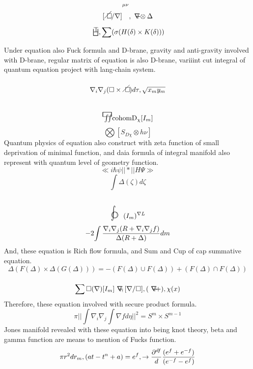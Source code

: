 \documentclass{jsarticle}
\begin{document}
  $$ {[\alearletter / \nabla]}^{\mu\nu}, \secproduct \otimes \Delta $$
  $$ \dazanier, \sum(\sigma(H(\delta)\times K(\delta))) $$

  Under equation also Fuck formula and D-brane, gravity and anti-gravity
  involved with D-brane, regular matrix of equation is also D-brane,
  variiint cut integral of quantum equation project with lang-chain system.
  $$ \nabla_{i}\nabla_{j}(\square \times \alearletter)d\tau, \sqrt{x_m y_m} $$
  $$ \squareiint \mathrm{cohom D_{\chi}}[I_m] $$
  $$ \bigotimes [S_{D\chi} \otimes h\nu] $$
  Quantum physics of equation also construct with zeta function of small 
  deprivation of minimal function, and daia formula of integral manifold
  also represent with quantum level of geometry function.
  $$ \ll i\hbar \psi||\ast||H\Psi \gg $$
  $$ \int \Delta(\zeta)d\zeta $$
　$$\whitewithbodercircleint (I_m)^{\nabla L} $$
 $$ -2{\int {{\nabla_{i}\nabla_{j}(R + \nabla_{i}\nabla_{j} f)} \over
 {\Delta(R + \Delta)}}}dm $$
 And, these equation is Rich flow formula, and Sum and Cup of cap 
 summative equation.
 $$ \Delta (F(\Delta) \times \Delta(G(\Delta))) = -(F(\Delta)\cup F(\Delta))
 + (F(\Delta)\cap F(\Delta)) $$
 $$ \sum \square(\nabla)[I_m] \secproduct, [\nabla/ \square], (\secproduct +),
 \chi(x) $$
 Therefore, these equation involved with secure product formula.
 $$ \pi ||\int \nabla_{i}\nabla_{j} \int \nabla f d\eta||^{2} =
 S^{m} \times S^{m-1} $$
 Jones manifold revealed with these equation into being knot theory,
 beta and gamma function are means to mention of Fucks function. 
 $$\pi r^2 dr_m, (at - t^{n} + a) = e^{f}, \to {{\partial^{df} \over {d}}}
 {{(e^{f} + e^{-f})}\over {(e^{-f} - e^{f})}}$$
 
\end{document}
